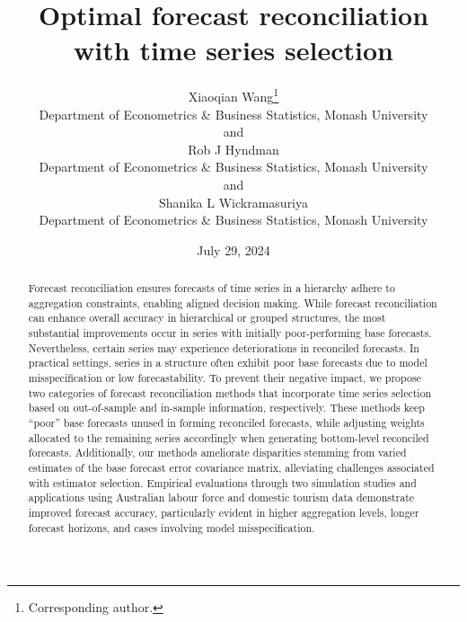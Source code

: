 \documentclass[
  11pt]{article}
\theoremstyle{plain}
\theoremstyle{remark}
\begin{document}
\def\spacingset#1{\renewcommand{\baselinestretch}%
{#1}\small\normalsize} \spacingset{1}

\renewcommand*{\arraystretch}{0.5} %


\date{July 29, 2024}
\title{\bf Optimal forecast reconciliation with time series selection}
\author{
Xiaoqian Wang\thanks{Corresponding author.} \vspace{0.2em}\\
Department of Econometrics \& Business Statistics, Monash
University \vspace{0.2em}\\
and \vspace{0.2em}\\Rob J Hyndman \vspace{0.2em}\\
Department of Econometrics \& Business Statistics, Monash
University \vspace{0.2em}\\
and \vspace{0.2em}\\Shanika L Wickramasuriya \vspace{0.2em}\\
Department of Econometrics \& Business Statistics, Monash
University \vspace{0.2em}\\
}
\maketitle

\bigskip
\bigskip
\begin{abstract}
Forecast reconciliation ensures forecasts of time series in a hierarchy
adhere to aggregation constraints, enabling aligned decision making.
While forecast reconciliation can enhance overall accuracy in
hierarchical or grouped structures, the most substantial improvements
occur in series with initially poor-performing base forecasts.
Nevertheless, certain series may experience deteriorations in reconciled
forecasts. In practical settings, series in a structure often exhibit
poor base forecasts due to model misspecification or low
forecastability. To prevent their negative impact, we propose two
categories of forecast reconciliation methods that incorporate time
series selection based on out-of-sample and in-sample information,
respectively. These methods keep ``poor'' base forecasts unused in
forming reconciled forecasts, while adjusting weights allocated to the
remaining series accordingly when generating bottom-level reconciled
forecasts. Additionally, our methods ameliorate disparities stemming
from varied estimates of the base forecast error covariance matrix,
alleviating challenges associated with estimator selection. Empirical
evaluations through two simulation studies and applications using
Australian labour force and domestic tourism data demonstrate improved
forecast accuracy, particularly evident in higher aggregation levels,
longer forecast horizons, and cases involving model misspecification.
\end{abstract}
\end{document}
